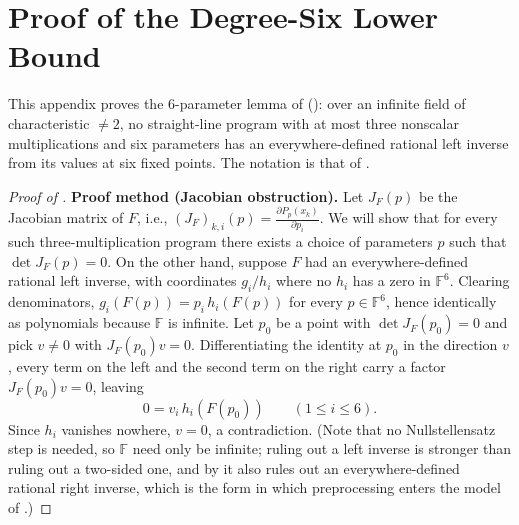 \section{Proof of the Degree-Six Lower Bound}
\label{appendix:lower}

This appendix proves the $6$-parameter lemma of 
(): over an infinite field of characteristic $\neq2$, no
straight-line program with at most three nonscalar multiplications and six parameters
has an everywhere-defined rational left inverse from its values at six fixed points.
The notation is that of .

\begin{proof}[Proof of ]
\noindent\textbf{Proof method (Jacobian obstruction).}
Let $J_F(p)$ be the Jacobian matrix of $F$, i.e., $(J_F)_{k,i}(p)=\frac{\partial P_p(x_k)}{\partial p_i}$.
We will show that for every such three-multiplication program there exists a choice of parameters $p$ such that $\det J_F(p)=0$.
On the other hand, suppose $F$ had an everywhere-defined rational left inverse,
with coordinates $g_i/h_i$ where no $h_i$ has a zero in $\mathbb{F}^6$.  Clearing
denominators, $g_i(F(p))=p_i\,h_i(F(p))$ for every $p\in\mathbb{F}^6$, hence
identically as polynomials because $\mathbb{F}$ is infinite.  Let $p_0$ be a point
with $\det J_F(p_0)=0$ and pick $v\neq0$ with $J_F(p_0)v=0$.  Differentiating the
identity at $p_0$ in the direction $v$, every term on the left and the second term
on the right carry a factor $J_F(p_0)v=0$, leaving
\[
   0=v_i\,h_i(F(p_0))\qquad(1\le i\le 6).
\]
Since $h_i$ vanishes nowhere, $v=0$, a contradiction.  (Note that no
Nullstellensatz step is needed, so $\mathbb{F}$ need only be infinite; ruling out a
left inverse is stronger than ruling out a two-sided one, and by
 it also rules out an everywhere-defined rational right
inverse, which is the form in which preprocessing enters the model of
.)


\end{proof}
